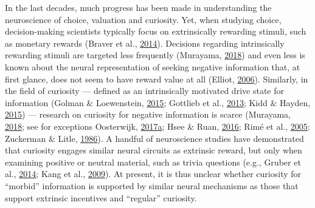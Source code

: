 \documentclass[12pt,american,a4paper,oneside,]{memoir} %
\begin{document}
In the last decades, much progress has been made in understanding the neuroscience of choice, valuation and curiosity. Yet, when studying choice, decision-making scientists typically focus on extrinsically rewarding stimuli, such as monetary rewards (Braver et al., \protect\hyperlink{ref-braver2014mechanisms}{2014}). Decisions regarding intrinsically rewarding stimuli are targeted less frequently (Murayama, \protect\hyperlink{ref-murayama2018psychological}{2018}) and even less is known about the neural representation of seeking negative information that, at first glance, does not seem to have reward value at all (Elliot, \protect\hyperlink{ref-elliot2006hierarchical}{2006}). Similarly, in the field of curiosity --- defined as an intrinsically motivated drive state for information (Golman \& Loewenstein, \protect\hyperlink{ref-golman2015curiosity}{2015}; Gottlieb et al., \protect\hyperlink{ref-gottlieb2013information}{2013}; Kidd \& Hayden, \protect\hyperlink{ref-kidd2015psychology}{2015}) --- research on curiosity for negative information is scarce (Murayama, \protect\hyperlink{ref-murayama2018psychological}{2018}; see for exceptions Oosterwijk, \protect\hyperlink{ref-oosterwijk2017choosing}{2017}\protect\hyperlink{ref-oosterwijk2017choosing}{a}; Hsee \& Ruan, \protect\hyperlink{ref-hsee2016pandora}{2016}; Rimé et al., \protect\hyperlink{ref-rime2005brief}{2005}; Zuckerman \& Litle, \protect\hyperlink{ref-zuckerman1986personality}{1986}). A handful of neuroscience studies have demonstrated that curiosity engages similar neural circuits as extrinsic reward, but only when examining positive or neutral material, such as trivia questions (e.g., Gruber et al., \protect\hyperlink{ref-gruber2014states}{2014}; Kang et al., \protect\hyperlink{ref-kang2009wick}{2009}). At present, it is thus unclear whether curiosity for ``morbid'' information is supported by similar neural mechanisms as those that support extrinsic incentives and ``regular'' curiosity.
\end{document}
